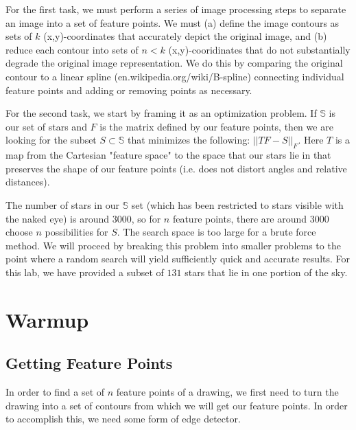 \documentclass[paper=a4, fontsize=11pt]{scrartcl} %
\begin{document}
For the first task, we must perform a series of image processing steps to separate an image into a set of feature points. We must (a) define the image contours as sets of $k$ (x,y)-coordinates that accurately depict the original image, and (b) reduce each contour into sets of $n<k$ (x,y)-cooridinates that do not substantially degrade the original image representation. We do this by comparing the original contour to a linear spline (en.wikipedia.org/wiki/B-spline) connecting individual feature points and adding or removing points as necessary. 

For the second task, we start by framing it as an optimization problem. If $\mathbb{S}$ is our set of stars and $F$ is the matrix defined by our feature points, then we are looking for the subset $S\subset\mathbb{S}$ that minimizes the following: $||TF - S||_F$.  Here $T$ is a map from the Cartesian "feature space" to the space that our stars lie in that preserves the shape of our feature points (i.e. does not distort angles and relative distances).

The number of stars in our $\mathbb{S}$ set (which has been restricted to stars visible with the naked eye) is around 3000, so for $n$ feature points, there are around 3000 choose $n$ possibilities for $S$. The search space is too large for a brute force method.  We will proceed by breaking this problem into smaller problems to the point where a random search will yield sufficiently quick and accurate results. For this lab, we have provided a subset of $131$ stars that lie in one portion of the sky.
\section{Warmup}

\subsection{Getting Feature Points}

In order to find a set of $n$ feature points of a drawing, we first need to turn the drawing into a set of contours from which we will get our feature points. In order to accomplish this, we need some form of edge detector. 
\end{document}
